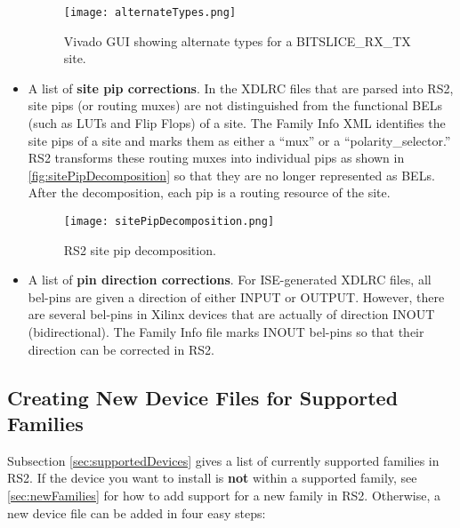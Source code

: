 \begin{itemize}
  \begin{figure}[H]
    \centering
    \texttt{[image: alternateTypes.png]}
    \caption{Vivado GUI showing alternate types for a BITSLICE\_RX\_TX site.}
    \label{fig:alternateTypes}
  \end{figure}
  
  \item A list of \textbf{site pip corrections}. In the XDLRC files that are
  parsed into RS2, site pips (or routing muxes) are not distinguished
  from the functional BELs (such as LUTs and Flip Flops) of a site. The
  Family Info XML identifies the site pips of a site and marks them as either
  a ``mux'' or a ``polarity\_selector.'' RS2 transforms these routing
  muxes into individual pips as shown in \autoref{fig:sitePipDecomposition} so
  that they are no longer represented as BELs. After the decomposition, each pip
  is a routing resource of the site.
  
  \begin{figure}[H]
    \centering
    \texttt{[image: sitePipDecomposition.png]}
    \caption{RS2 site pip decomposition.}
    \label{fig:sitePipDecomposition}
  \end{figure}
  
  \item A list of \textbf{pin direction corrections}. For ISE-generated XDLRC
  files, all bel-pins are given a direction of either INPUT or OUTPUT. However,
  there are several bel-pins in Xilinx devices that are actually of direction
  INOUT (bidirectional). The Family Info file marks INOUT bel-pins so that
  their direction can be corrected in RS2.
  
\end{itemize}

\subsection{Creating New Device Files for Supported Families} \label{sec:creatingNewSupportedDevices} 
Subsection \ref{sec:supportedDevices} gives a list of currently supported
families in RS2. If the device you want to install is \textbf{not} within a
supported family, see \autoref{sec:newFamilies} for how to add support for a
new family in RS2. Otherwise, a new device file can be added in four
easy steps:

